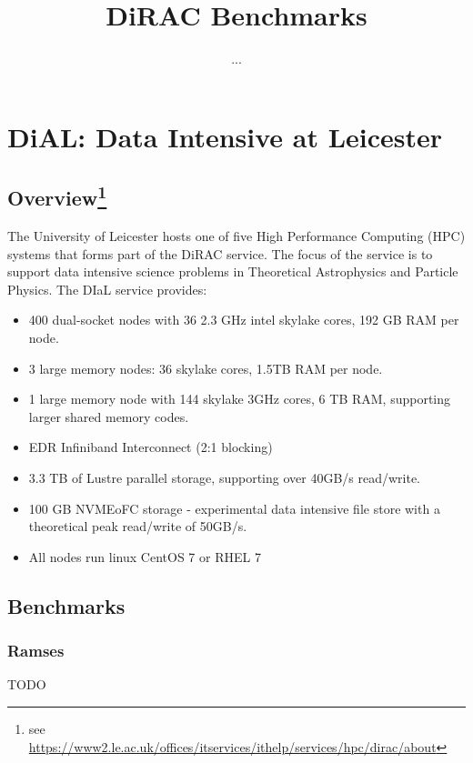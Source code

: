 \documentclass[10pt]{article}
\title{DiRAC Benchmarks}
\author{...}
\begin{document}
\maketitle

\section{DiAL: Data Intensive at Leicester}

\subsection{Overview{\footnote{see \url{https://www2.le.ac.uk/offices/itservices/ithelp/services/hpc/dirac/about}}}
}

The University of Leicester hosts one of five High Performance Computing (HPC) systems that forms part of the DiRAC service. The focus of the service is to support data intensive science problems in Theoretical Astrophysics and Particle Physics. The DIaL service provides:

\begin{itemize}
	\item 400 dual-socket nodes with 36 2.3 GHz intel skylake cores, 192 GB RAM per node.
	\item 3 large memory nodes: 36 skylake cores, 1.5TB RAM per node.
	\item 1 large memory node with 144 skylake 3GHz cores, 6 TB RAM, supporting larger shared memory codes.
	\item EDR Infiniband Interconnect (2:1 blocking)
	\item 3.3 TB of Lustre parallel storage, supporting over 40GB/s read/write.
	\item 100 GB NVMEoFC storage - experimental data intensive file store with a theoretical peak read/write of 50GB/s.
	\item All nodes run linux CentOS 7 or RHEL 7
\end{itemize}

\clearpage
\subsection{Benchmarks}

\subsubsection{Ramses}
TODO
\end{document}
